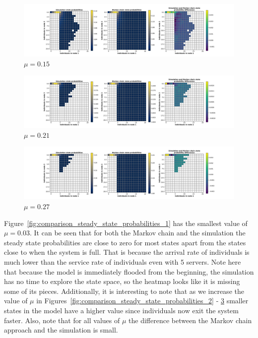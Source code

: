 \begin{figure}[H]
    \includegraphics[width=\textwidth, trim=100 10 100 10, clip]{chapters/03_queueing_model/img/numeric_results_and_timings/steady_state_probabilities/main_5.pdf}
    \caption{\(\mu = 0.15\)}
    \label{fig:comparison_steady_state_probabilities_3}
\end{figure}

\begin{figure}[H]
    \includegraphics[width=\textwidth, trim=100 10 100 10, clip]{chapters/03_queueing_model/img/numeric_results_and_timings/steady_state_probabilities/main_7.pdf}
    \caption{\(\mu = 0.21\)}
    \label{fig:comparison_steady_state_probabilities_4}
\end{figure}

\begin{figure}[H]
    \includegraphics[width=\textwidth, trim=100 10 100 10, clip]{chapters/03_queueing_model/img/numeric_results_and_timings/steady_state_probabilities/main_9.pdf}
    \caption{\(\mu = 0.27\)}
    \label{fig:comparison_steady_state_probabilities_5}
\end{figure}

Figure~\ref{fig:comparison_steady_state_probabilities_1} has the smallest
value of \(\mu = 0.03\).
It can be seen that for both the Markov chain and the simulation the steady
state probabilities are close to zero for most states apart from the
states close to when the system is full.
That is because the arrival rate of individuals is much lower than the service
rate of individuals even with 5 servers.
Note here that because the model is immediately flooded from the beginning, the
simulation has no time to explore the state space, so the heatmap looks like
it is missing some of its pieces.
Additionally, it is interesting to note that as we increase the value of \(\mu\)
in Figures~\ref{fig:comparison_steady_state_probabilities_2} -
\ref{fig:comparison_steady_state_probabilities_5} smaller states in the model
have a higher value since individuals now exit the system faster.
Also, note that for all values of \(\mu\) the difference between the Markov
chain approach and the simulation is small.

